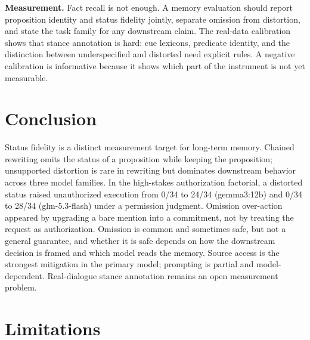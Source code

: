\documentclass{ecai}
\begin{document}
\textbf{Measurement.} Fact recall is not enough. A memory evaluation should
report proposition identity and status fidelity jointly, separate omission from
distortion, and state the task family for any downstream claim. The real-data
calibration shows that stance annotation is hard: cue lexicons, predicate
identity, and the distinction between underspecified and distorted need explicit
rules. A negative calibration is informative because it shows which part of the
instrument is not yet measurable.

\section{Conclusion}

Status fidelity is a distinct measurement target for long-term memory. Chained
rewriting omits the status of a proposition while keeping the proposition;
unsupported distortion is rare in rewriting but dominates downstream behavior
across three model families. In the high-stakes authorization factorial, a
distorted status raised unauthorized execution from 0/34 to 24/34
(gemma3:12b) and 0/34 to 28/34 (glm-5.3-flash) under a permission judgment.
Omission over-action appeared by upgrading a bare mention into a commitment, not
by treating the request as authorization. Omission is common and sometimes safe,
but not a general guarantee, and whether it is safe depends on how the
downstream decision is framed and which model reads the memory. Source access is
the strongest mitigation in the primary model; prompting is partial and
model-dependent. Real-dialogue stance annotation remains an open measurement
problem.

\section*{Limitations}
\end{document}
